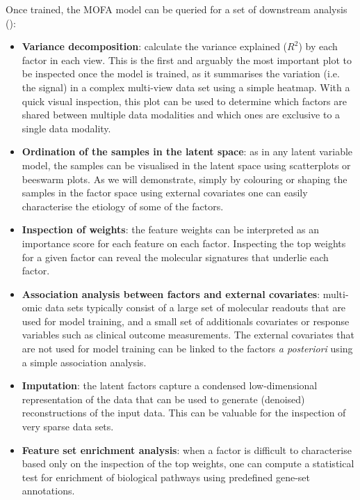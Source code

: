 Once trained, the MOFA model can be queried for a set of downstream analysis ():
\begin{itemize}
	\item \textbf{Variance decomposition}: calculate the variance explained ($R^2$) by each factor in each view. This is the first and arguably the most important plot to be inspected once the model is trained, as it summarises the variation (i.e. the signal) in a complex multi-view data set using a simple heatmap. With a quick visual inspection, this plot can be used to determine which factors are shared between multiple data modalities and which ones are exclusive to a single data modality.

	\item \textbf{Ordination of the samples in the latent space}: as in any latent variable model, the samples can be visualised in the latent space using scatterplots or beeswarm plots. As we will demonstrate, simply by colouring or shaping the samples in the factor space using external covariates one can easily characterise the etiology of some of the factors.

	\item \textbf{Inspection of weights}: the feature weights can be interpreted as an importance score for each feature on each factor. Inspecting the top weights for a given factor can reveal the molecular signatures that underlie each factor.

	\item \textbf{Association analysis between factors and external covariates}: multi-omic data sets typically consist of a large set of molecular readouts that are used for model training, and a small set of additionals covariates or response variables such as clinical outcome measurements. The external covariates that are not used for model training can be linked to the factors \textit{a posteriori} using a simple association analysis.

	\item \textbf{Imputation}: the latent factors capture a condensed low-dimensional representation of the data that can be used to generate (denoised) reconstructions of the input data. This can be valuable for the inspection of very sparse data sets.

	\item \textbf{Feature set enrichment analysis}: when a factor is difficult to characterise based only on the inspection of the top weights, one can compute a statistical test for enrichment of biological pathways using predefined gene-set annotations.

\end{itemize}

